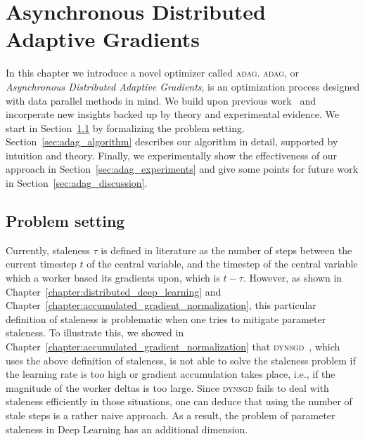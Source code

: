 %
%
%

\chapter{Asynchronous Distributed Adaptive Gradients}
\label{chapter:asynchronous_distributed_adaptive_gradients}

In this chapter we introduce a novel optimizer called \textsc{adag}. \textsc{adag}, or \emph{Asynchronous Distributed Adaptive Gradients}, is an optimization process designed with data parallel methods in mind. We build upon previous work~\cite{dean2012large,hadjis2016omnivore,kingma2014adam,zhang2015deep,jiang2017heterogeneity} and incorperate new insights backed up by theory and experimental evidence. We start in Section~\ref{sec:adag_problem_setting} by formalizing the problem setting. Section~\ref{sec:adag_algorithm} describes our algorithm in detail, supported by intuition and theory. Finally, we experimentally show the effectiveness of our approach in Section~\ref{sec:adag_experiments} and give some points for future work in Section~\ref{sec:adag_discussion}.

\section{Problem setting}
\label{sec:adag_problem_setting}

Currently, staleness $\tau$ is defined in literature as the number of steps between the current timestep $t$ of the central variable, and the timestep of the central variable which a worker based its gradients upon, which is $t - \tau$. However, as shown in Chapter~\ref{chapter:distributed_deep_learning} and Chapter~\ref{chapter:accumulated_gradient_normalization}, this particular definition of staleness is problematic when one tries to mitigate parameter staleness. To illustrate this, we showed in Chapter~\ref{chapter:accumulated_gradient_normalization} that \textsc{dynsgd}~\cite{jiang2017heterogeneity}, which uses the above definition of staleness, is not able to solve the staleness problem if the learning rate is too high or gradient accumulation takes place, i.e., if the magnitude of the worker deltas is too large. Since \textsc{dynsgd} fails to deal with staleness efficiently in those situations, one can deduce that using the number of stale steps is a rather naive approach. As a result, the problem of parameter staleness in Deep Learning has an additional dimension.\\

